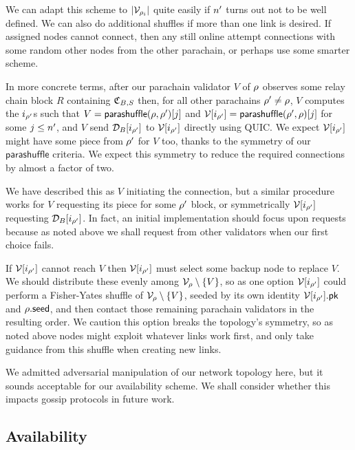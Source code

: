 We can adapt this scheme to $|\mathcal{V}_{\rho_i}|$ quite easily if $n'$ turns out not to be well defined.  We can also do additional shuffles if more than one link is desired.  If assigned nodes cannot connect, then any still online attempt connections with some random other nodes from the other parachain, or perhaps use some smarter scheme. 

In more concrete terms, after our parachain validator $V$ of $\rho$ observes some relay chain block $R$ containing $\mathfrak{C}_{B,S}$ then, for all other parachains $\rho' \ne \rho$, $V$ computes the $i_{\rho'}$s such that $V = \mathsf{parashuffle}(\rho,\rho')[j]$ and $\mathcal{V}[i_{\rho'}] = \mathsf{parashuffle}(\rho',\rho)[j]$ for some $j \leq n'$, and $V$ send $\mathcal{D}_B[i_{\rho'}]$ to $\mathcal{V}[i_{\rho'}]$ directly using QUIC.  We expect $\mathcal{V}[i_{\rho'}]$ might have some piece from $\rho'$ for $V$ too, thanks to the symmetry of our $\mathsf{parashuffle}$ criteria.  We expect this symmetry to reduce the required connections by almost a factor of two.

We have described this as $V$ initiating the connection, but a similar procedure works for $V$ requesting its piece for some $\rho'$ block, or symmetrically $\mathcal{V}[i_{\rho'}]$ requesting $\mathcal{D}_B[i_{\rho'}]$.  In fact, an initial implementation should focus upon requests because as noted above we shall request from other validators when our first choice fails. 

If $\mathcal{V}[i_{\rho'}]$ cannot reach $V$ then $\mathcal{V}[i_{\rho'}]$ must select some backup node to replace $V$.  We should distribute these evenly among $\mathcal{V}_{\rho} \setminus \{V\}$, so as one option $\mathcal{V}[i_{\rho'}]$ could perform a Fisher-Yates shuffle of $\mathcal{V}_{\rho} \setminus \{V\}$, seeded by its own identity $\mathcal{V}[i_{\rho'}].\mathsf{pk}$ and $\rho.\mathsf{seed}$, and then contact those remaining parachain validators in the resulting order.  We caution this option breaks the topology's symmetry, so as noted above nodes might exploit whatever links work first, and only take guidance from this shuffle when creating new links.  

We admitted adversarial manipulation of our network topology here, but it sounds acceptable for our availability scheme.  We shall consider whether this impacts gossip protocols in future work. 


\subsection{Availability} %
\label{sec:availability}

